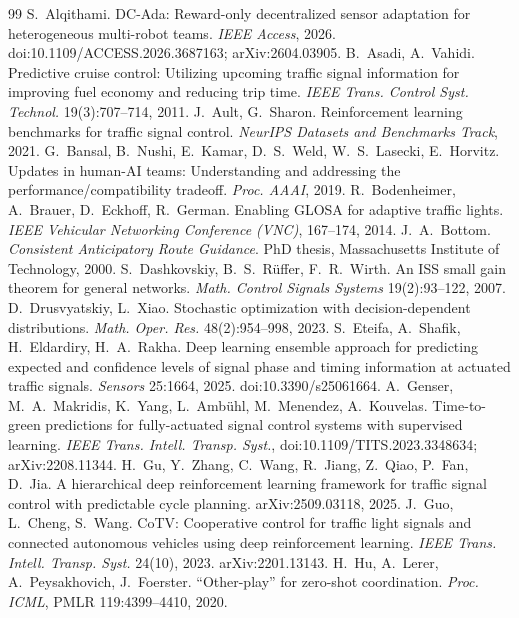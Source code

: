 \documentclass[11pt]{article}
\begin{document}
\begin{thebibliography}{99}\small\setlength\itemsep{1pt}
 S.~Alqithami. DC-Ada: Reward-only decentralized sensor adaptation for heterogeneous multi-robot teams. \emph{IEEE Access}, 2026. doi:10.1109/ACCESS.2026.3687163; arXiv:2604.03905.
 B.~Asadi, A.~Vahidi. Predictive cruise control: Utilizing upcoming traffic signal information for improving fuel economy and reducing trip time. \emph{IEEE Trans. Control Syst. Technol.} 19(3):707--714, 2011.
 J.~Ault, G.~Sharon. Reinforcement learning benchmarks for traffic signal control. \emph{NeurIPS Datasets and Benchmarks Track}, 2021.
 G.~Bansal, B.~Nushi, E.~Kamar, D.~S.~Weld, W.~S.~Lasecki, E.~Horvitz. Updates in human-AI teams: Understanding and addressing the performance/compatibility tradeoff. \emph{Proc. AAAI}, 2019.
 R.~Bodenheimer, A.~Brauer, D.~Eckhoff, R.~German. Enabling GLOSA for adaptive traffic lights. \emph{IEEE Vehicular Networking Conference (VNC)}, 167--174, 2014.
 J.~A.~Bottom. \emph{Consistent Anticipatory Route Guidance}. PhD thesis, Massachusetts Institute of Technology, 2000.
 S.~Dashkovskiy, B.~S.~R\"uffer, F.~R.~Wirth. An ISS small gain theorem for general networks. \emph{Math. Control Signals Systems} 19(2):93--122, 2007.
 D.~Drusvyatskiy, L.~Xiao. Stochastic optimization with decision-dependent distributions. \emph{Math. Oper. Res.} 48(2):954--998, 2023.
 S.~Eteifa, A.~Shafik, H.~Eldardiry, H.~A.~Rakha. Deep learning ensemble approach for predicting expected and confidence levels of signal phase and timing information at actuated traffic signals. \emph{Sensors} 25:1664, 2025. doi:10.3390/s25061664.
 A.~Genser, M.~A.~Makridis, K.~Yang, L.~Amb\"uhl, M.~Menendez, A.~Kouvelas. Time-to-green predictions for fully-actuated signal control systems with supervised learning. \emph{IEEE Trans. Intell. Transp. Syst.}, doi:10.1109/TITS.2023.3348634; arXiv:2208.11344.
 H.~Gu, Y.~Zhang, C.~Wang, R.~Jiang, Z.~Qiao, P.~Fan, D.~Jia. A hierarchical deep reinforcement learning framework for traffic signal control with predictable cycle planning. arXiv:2509.03118, 2025.
 J.~Guo, L.~Cheng, S.~Wang. CoTV: Cooperative control for traffic light signals and connected autonomous vehicles using deep reinforcement learning. \emph{IEEE Trans. Intell. Transp. Syst.} 24(10), 2023. arXiv:2201.13143.
 H.~Hu, A.~Lerer, A.~Peysakhovich, J.~Foerster. ``Other-play'' for zero-shot coordination. \emph{Proc. ICML}, PMLR 119:4399--4410, 2020.

\end{thebibliography}
\end{document}
